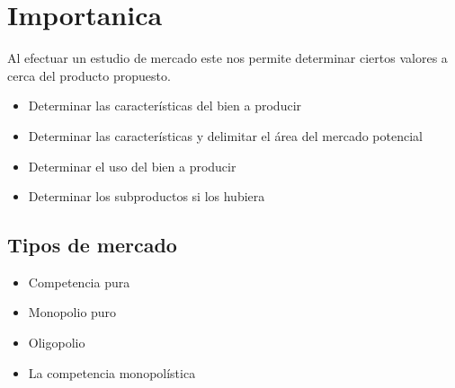 \section*{Importanica}
Al efectuar un estudio de mercado este nos permite determinar ciertos valores a cerca del producto
propuesto.
\begin{itemize}
    \item Determinar las características del bien a producir
    \item Determinar las características y delimitar el área del mercado potencial
    \item Determinar el uso del bien a producir
    \item Determinar los subproductos si los hubiera
\end{itemize}
\subsection{Tipos de mercado}
\begin{itemize}
    \item Competencia pura
    \item Monopolio puro
    \item Oligopolio
    \item La competencia monopolística
\end{itemize}
